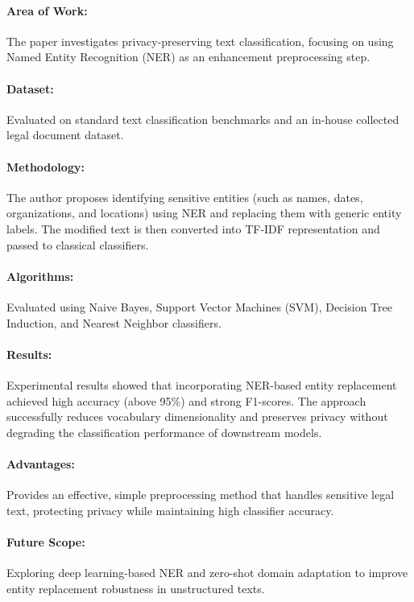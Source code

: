 \documentclass[12pt, a4paper]{report}
\begin{document}
\paragraph{Area of Work:}
The paper investigates privacy-preserving text classification, focusing on using Named Entity Recognition (NER) as an enhancement preprocessing step.

\paragraph{Dataset:}
Evaluated on standard text classification benchmarks and an in-house collected legal document dataset.

\paragraph{Methodology:}
The author proposes identifying sensitive entities (such as names, dates, organizations, and locations) using NER and replacing them with generic entity labels. The modified text is then converted into TF-IDF representation and passed to classical classifiers.

\paragraph{Algorithms:}
Evaluated using Naive Bayes, Support Vector Machines (SVM), Decision Tree Induction, and Nearest Neighbor classifiers.

\paragraph{Results:}
Experimental results showed that incorporating NER-based entity replacement achieved high accuracy (above 95\%) and strong F1-scores. The approach successfully reduces vocabulary dimensionality and preserves privacy without degrading the classification performance of downstream models.

\paragraph{Advantages:}
Provides an effective, simple preprocessing method that handles sensitive legal text, protecting privacy while maintaining high classifier accuracy.

\paragraph{Future Scope:}
Exploring deep learning-based NER and zero-shot domain adaptation to improve entity replacement robustness in unstructured texts.
\end{document}
